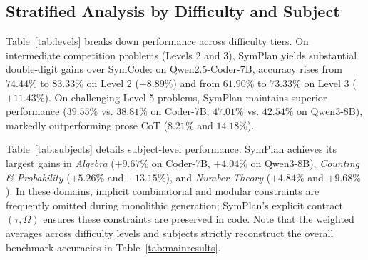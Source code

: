 \documentclass[conference,a4paper]{IEEEtran}
\begin{document}
\begin{table}[t]
\centering
\caption{Subject-wise accuracy (\%) on MATH-500 comparing CoT, SymCode (SC), and SymPlan (SP).}
\label{tab:subjects}
\end{table}

\subsection{Stratified Analysis by Difficulty and Subject}

Table~\ref{tab:levels} breaks down performance across difficulty tiers. On intermediate competition problems (Levels 2 and 3), SymPlan yields substantial double-digit gains over SymCode: on Qwen2.5-Coder-7B, accuracy rises from $74.44\%$ to $83.33\%$ on Level 2 ($+8.89\%$) and from $61.90\%$ to $73.33\%$ on Level 3 ($+11.43\%$). On challenging Level 5 problems, SymPlan maintains superior performance ($39.55\%$ vs. $38.81\%$ on Coder-7B; $47.01\%$ vs. $42.54\%$ on Qwen3-8B), markedly outperforming prose CoT ($8.21\%$ and $14.18\%$).

Table~\ref{tab:subjects} details subject-level performance. SymPlan achieves its largest gains in \textit{Algebra} ($+9.67\%$ on Coder-7B, $+4.04\%$ on Qwen3-8B), \textit{Counting \& Probability} ($+5.26\%$ and $+13.15\%$), and \textit{Number Theory} ($+4.84\%$ and $+9.68\%$). In these domains, implicit combinatorial and modular constraints are frequently omitted during monolithic generation; SymPlan's explicit contract $(\tau, \Omega)$ ensures these constraints are preserved in code. Note that the weighted averages across difficulty levels and subjects strictly reconstruct the overall benchmark accuracies in Table~\ref{tab:mainresults}.
\end{document}
